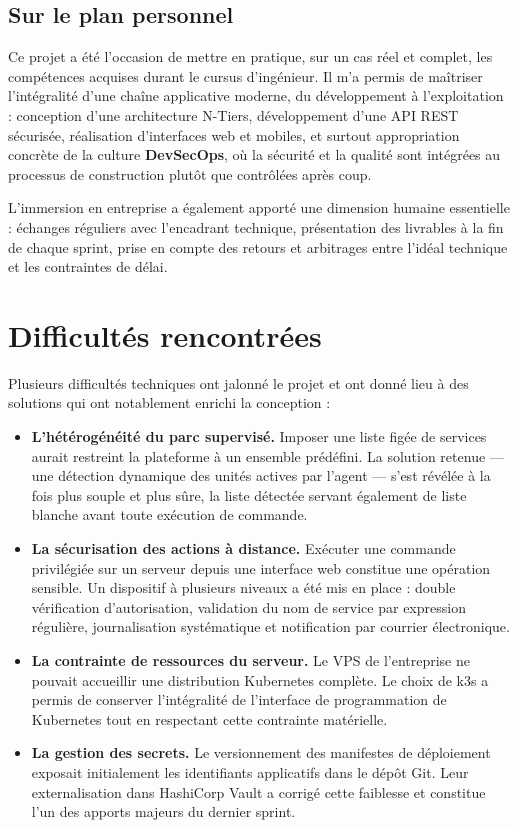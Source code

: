 \subsection*{Sur le plan personnel}
Ce projet a été l'occasion de mettre en pratique, sur un cas réel et complet, les
compétences acquises durant le cursus d'ingénieur. Il m'a permis de maîtriser
l'intégralité d'une chaîne applicative moderne, du développement à l'exploitation :
conception d'une architecture N-Tiers, développement d'une API REST sécurisée,
réalisation d'interfaces web et mobiles, et surtout appropriation concrète de la culture
\textbf{DevSecOps}, où la sécurité et la qualité sont intégrées au processus de
construction plutôt que contrôlées après coup.

L'immersion en entreprise a également apporté une dimension humaine essentielle :
échanges réguliers avec l'encadrant technique, présentation des livrables à la fin de
chaque sprint, prise en compte des retours et arbitrages entre l'idéal technique et les
contraintes de délai.

\section*{Difficultés rencontrées}

Plusieurs difficultés techniques ont jalonné le projet et ont donné lieu à des solutions
qui ont notablement enrichi la conception :

\begin{itemize}[label=]
  \item \textbf{L'hétérogénéité du parc supervisé.} Imposer une liste figée de services
        aurait restreint la plateforme à un ensemble prédéfini. La solution retenue —
        une détection dynamique des unités actives par l'agent — s'est révélée à la fois
        plus souple et plus sûre, la liste détectée servant également de liste blanche
        avant toute exécution de commande.
  \item \textbf{La sécurisation des actions à distance.} Exécuter une commande
        privilégiée sur un serveur depuis une interface web constitue une opération
        sensible. Un dispositif à plusieurs niveaux a été mis en place : double
        vérification d'autorisation, validation du nom de service par expression
        régulière, journalisation systématique et notification par courrier électronique.
  \item \textbf{La contrainte de ressources du serveur.} Le VPS de l'entreprise ne
        pouvait accueillir une distribution Kubernetes complète. Le choix de k3s a permis
        de conserver l'intégralité de l'interface de programmation de Kubernetes tout en
        respectant cette contrainte matérielle.
  \item \textbf{La gestion des secrets.} Le versionnement des manifestes de déploiement
        exposait initialement les identifiants applicatifs dans le dépôt Git. Leur
        externalisation dans HashiCorp Vault a corrigé cette faiblesse et constitue l'un
        des apports majeurs du dernier sprint.
\end{itemize}


